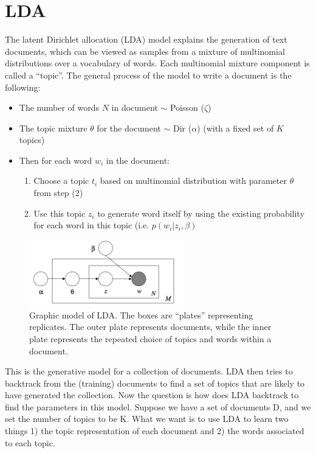 \documentclass{article} %
\begin{document}
\section{LDA}
The latent Dirichlet allocation (LDA) model explains the generation of text documents, which can be viewed as samples from a mixture of multinomial distributions over a vocabulary of words. Each multinomial mixture component is called a “topic”. The general process of the model to write a document is the following:

\begin{itemize}
\item The number of words $N$ in document $\sim$ Poisson ($\zeta$)
\item The topic mixture $\theta$ for the document $\sim$ Dir ($\alpha$) (with a fixed set of $K$ topics)
\item Then for each word $w_i$ in the document:
\begin{enumerate}
\item Choose a topic $t_i$ based on multinomial distribution with parameter $\theta$ from step (2)
\item Use this topic $z_i$ to generate word itself by using the existing probability for each word in this topic (i.e. $p(w_i | z_i, \beta)$
\end{enumerate}
\end{itemize}

\begin{figure}
    \centering
    \includegraphics[width=0.6\textwidth]{graphmodel}
    \caption{Graphic model of LDA. The boxes are ``plates'' representing replicates. The outer plate represents documents, while the inner plate represents the repeated choice of topics and words within a document.}
    \label{fig:graphmodel}
\end{figure}


This is the generative model for a collection of documents. LDA then tries to backtrack from the (training) documents to find a set of topics that are likely to have generated the collection. Now the question is how does LDA backtrack to find the parameters in this model. Suppose we have a set of documents D, and we set the number of topics to be K. What we want is to use LDA to learn two things 1) the topic representation of each document and 2) the words associated to each topic.
\end{document}
